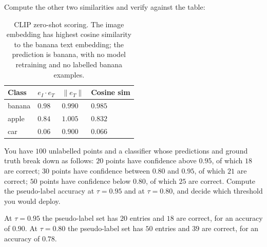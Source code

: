 Compute the other two similarities and verify against the table:

\begin{table}[ht]
\centering
\begin{tabular}{p{}p{}p{}p{}}
    \toprule
    \textbf{Class} & \textbf{$e_I \cdot e_T$} & \textbf{$\|e_T\|$} & \textbf{Cosine sim} \\
    \midrule
    banana & $0.98$ & $0.990$ & $0.985$ \\
    apple  & $0.84$ & $1.005$ & $0.832$ \\
    car    & $0.06$ & $0.900$ & $0.066$ \\
    \bottomrule
\end{tabular}
\vspace{2em}
\caption{CLIP zero-shot scoring. The image embedding has highest cosine similarity to the banana text embedding; the prediction is banana, with no model retraining and no labelled banana examples.}
\label{tab:clip_zero_shot}
\end{table}


\vspace{2.5em}

You have $100$ unlabelled points and a classifier whose predictions and ground truth break down as follows: $20$ points have confidence above $0.95$, of which $18$ are correct; $30$ points have confidence between $0.80$ and $0.95$, of which $21$ are correct; $50$ points have confidence below $0.80$, of which $25$ are correct.
Compute the pseudo-label accuracy at $\tau = 0.95$ and at $\tau = 0.80$, and decide which threshold you would deploy.

\vspace{0.5em}

At $\tau = 0.95$ the pseudo-label set has $20$ entries and $18$ are correct, for an accuracy of $0.90$.
At $\tau = 0.80$ the pseudo-label set has $50$ entries and $39$ are correct, for an accuracy of $0.78$.


